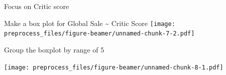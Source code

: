 \documentclass[ignorenonframetext,]{beamer}
\newenvironment{Shaded}{\begin{snugshade}}{\end{snugshade}}
\newcommand{\DataTypeTok}[1]{\textcolor[rgb]{0.13,0.29,0.53}{#1}}
\newcommand{\DecValTok}[1]{\textcolor[rgb]{0.00,0.00,0.81}{#1}}
\newcommand{\FloatTok}[1]{\textcolor[rgb]{0.00,0.00,0.81}{#1}}
\newcommand{\KeywordTok}[1]{\textcolor[rgb]{0.13,0.29,0.53}{\textbf{#1}}}
\newcommand{\NormalTok}[1]{#1}
\newcommand{\OperatorTok}[1]{\textcolor[rgb]{0.81,0.36,0.00}{\textbf{#1}}}
\newcommand{\StringTok}[1]{\textcolor[rgb]{0.31,0.60,0.02}{#1}}
\begin{document}
\begin{frame}[fragile]{Focus on Critic score}
\begin{block}{Make a box plot for Global Sale \textasciitilde{} Critic
Score}
\texttt{[image: preprocess\_files/figure-beamer/unnamed-chunk-7-2.pdf]}

\end{block}

\begin{block}{Group the boxplot by range of 5}

\begin{Shaded}
\end{Shaded}

\texttt{[image: preprocess\_files/figure-beamer/unnamed-chunk-8-1.pdf]}


\end{block}
\end{frame}
\end{document}
